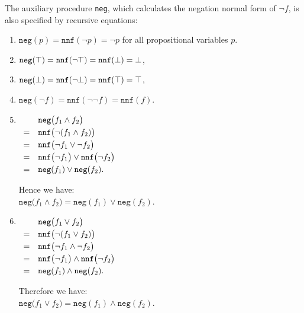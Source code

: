 The auxiliary procedure \texttt{neg}, which calculates the negation normal form of $\neg f$,
is also specified by recursive equations: 
\begin{enumerate}
\item $\texttt{neg}(p) = \texttt{nnf}(\neg p) = \neg p$ for all propositional variables $p$.
\item $\texttt{neg}(\top) = \texttt{nnf}(\neg\top) = \texttt{nnf}(\bot) = \bot$, 
\item $\texttt{neg}(\bot) = \texttt{nnf}(\neg\bot) = \texttt{nnf}(\top) = \top$,
\item $\texttt{neg}(\neg f) = \texttt{nnf}(\neg \neg f) = \texttt{nnf}(f)$.
\item $\begin{array}[t]{cl}
         & \texttt{neg}\bigl(f_1 \wedge f_2 \bigr) \\[0.1cm]
       = & \texttt{nnf}\bigl(\neg(f_1 \wedge f_2)\bigr) \\[0.1cm]
       = & \texttt{nnf}\bigl(\neg f_1 \vee \neg f_2\bigr) \\[0.1cm]
       = & \texttt{nnf}\bigl(\neg f_1\bigr) \vee \texttt{nnf}\bigl(\neg f_2\bigr) \\[0.1cm]
       = & \texttt{neg}(f_1) \vee \texttt{neg}(f_2).
       \end{array}
      $

      Hence we have:
      \\[0.2cm]
      \hspace*{1.3cm}
      $\texttt{neg}\bigl(f_1 \wedge f_2 \bigr) = \texttt{neg}(f_1) \vee \texttt{neg}(f_2)$.
\item $\begin{array}[t]{cl}
         & \texttt{neg}\bigl(f_1 \vee f_2 \bigr)        \\[0.1cm]
       = & \texttt{nnf}\bigl(\neg(f_1 \vee f_2) \bigr)  \\[0.1cm]
       = & \texttt{nnf}\bigl(\neg f_1 \wedge \neg f_2 \bigr)  \\[0.1cm]
       = & \texttt{nnf}\bigl(\neg f_1\bigr) \wedge \texttt{nnf}\bigl(\neg f_2 \bigr)  \\[0.1cm]
       = & \texttt{neg}(f_1) \wedge \texttt{neg}(f_2). 
       \end{array}
      $

      Therefore we have: 
      \\[0.2cm]
      \hspace*{1.3cm}
      $\texttt{neg}\bigl(f_1 \vee f_2 \bigr) = \texttt{neg}(f_1) \wedge \texttt{neg}(f_2)$.
\end{enumerate}

